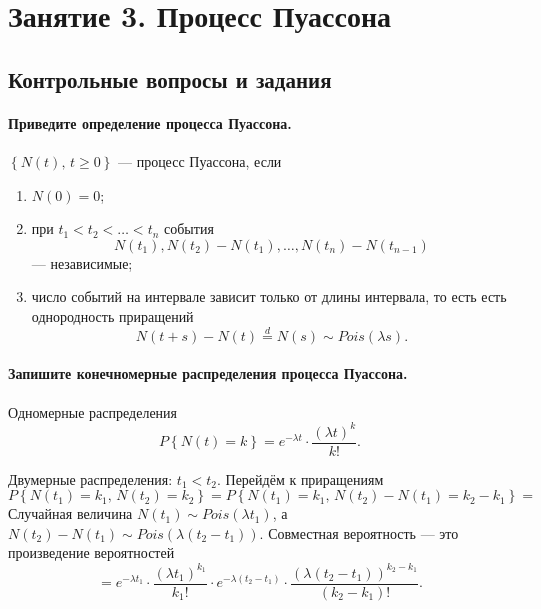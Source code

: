 \chapter*{Занятие 3. Процесс Пуассона}

\section*{Контрольные вопросы и задания}

\subsubsection*{Приведите определение процесса Пуассона.}

$\left\{ N \left( t \right), \, t \geq 0 \right\} $ --- процесс Пуассона, если
\begin{enumerate}
  \item $N \left( 0 \right) = 0$;
  \item при $t_1 < t_2 < \dotsc < t_n$ события
  $$N \left( t_1 \right), N \left( t_2 \right) - N \left( t_1 \right), \dotsc,
    N \left( t_n \right) - N \left( t_{n - 1} \right) $$
  --- независимые;
  \item число событий на интервале зависит только от длины интервала,
  то есть есть однородность приращений
  $$N \left( t + s \right) - N \left( t \right) \overset{d}{=}
    N \left( s \right) \sim
    Pois \left( \lambda s \right).$$
\end{enumerate}

\subsubsection*{Запишите конечномерные распределения процесса Пуассона.}

Одномерные распределения
$$P \left\{ N \left( t \right) = k \right\} =
  e^{-\lambda t} \cdot \frac{ \left( \lambda t \right)^k}{k!}.$$

Двумерные распределения: $t_1 < t_2$.
Перейдём к приращениям
$$P \left\{ N \left( t_1 \right) = k_1, \, N \left( t_2 \right) = k_2 \right\} =
  P \left\{
    N \left( t_1 \right) = k_1, \, N \left( t_2 \right) - N \left( t_1 \right) = k_2 - k_1
  \right\} =$$
Случайная величина $N \left( t_1 \right) \sim Pois \left( \lambda t_1 \right) $, а
$N \left( t_2 \right) - N \left( t_1 \right) \sim
  Pois \left( \lambda \left( t_2 - t_1 \right) \right) $.
Совместная вероятность --- это произведение вероятностей
$$= e^{-\lambda t_1} \cdot \frac{ \left( \lambda t_1 \right)^{k_1}}{k_1!} \cdot
  e^{-\lambda \left( t_2 - t_1 \right) } \cdot
  \frac{ \left( \lambda \left( t_2 - t_1 \right) \right)^{k_2 - k_1}}{ \left( k_2 - k_1 \right)!}.$$

